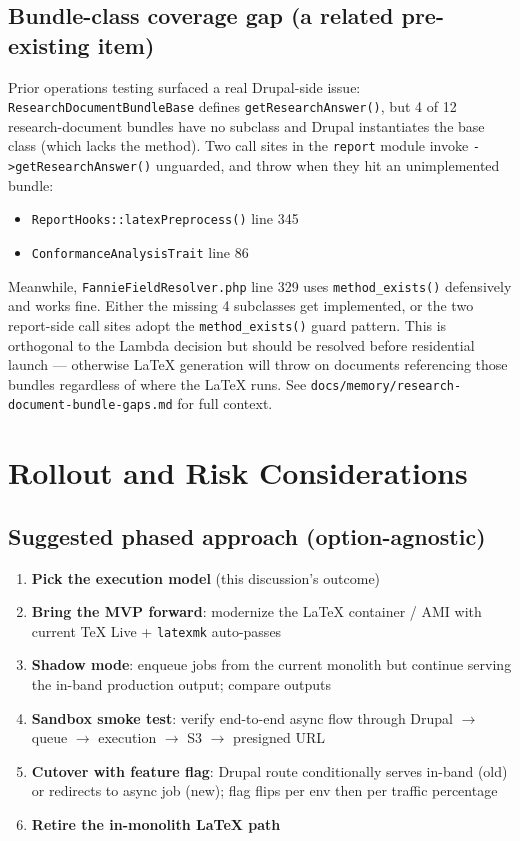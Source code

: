 \documentclass[11pt,letterpaper]{article}
\begin{document}
\subsection{Bundle-class coverage gap (a related pre-existing item)}
Prior operations testing surfaced a real Drupal-side issue: \texttt{ResearchDocumentBundleBase} defines \texttt{getResearchAnswer()}, but 4 of 12 research-document bundles have no subclass and Drupal instantiates the base class (which lacks the method). Two call sites in the \texttt{report} module invoke \texttt{->getResearchAnswer()} unguarded, and throw when they hit an unimplemented bundle:
\begin{itemize}[nosep]
  \item \texttt{ReportHooks::latexPreprocess()} line 345
  \item \texttt{ConformanceAnalysisTrait} line 86
\end{itemize}
Meanwhile, \texttt{FannieFieldResolver.php} line 329 uses \texttt{method\_exists()} defensively and works fine. Either the missing 4 subclasses get implemented, or the two report-side call sites adopt the \texttt{method\_exists()} guard pattern. This is orthogonal to the Lambda decision but should be resolved before residential launch --- otherwise LaTeX generation will throw on documents referencing those bundles regardless of where the LaTeX runs. See \texttt{docs/memory/research-document-bundle-gaps.md} for full context.

\newpage

\section{Rollout and Risk Considerations}
\label{sec:rollout}

\subsection{Suggested phased approach (option-agnostic)}
\begin{enumerate}[nosep]
  \item \textbf{Pick the execution model} (this discussion's outcome)
  \item \textbf{Bring the MVP forward}: modernize the LaTeX container / AMI with current TeX Live + \texttt{latexmk} auto-passes
  \item \textbf{Shadow mode}: enqueue jobs from the current monolith but continue serving the in-band production output; compare outputs
  \item \textbf{Sandbox smoke test}: verify end-to-end async flow through Drupal $\rightarrow$ queue $\rightarrow$ execution $\rightarrow$ S3 $\rightarrow$ presigned URL
  \item \textbf{Cutover with feature flag}: Drupal route conditionally serves in-band (old) or redirects to async job (new); flag flips per env then per traffic percentage
  \item \textbf{Retire the in-monolith LaTeX path}
\end{enumerate}
\end{document}
